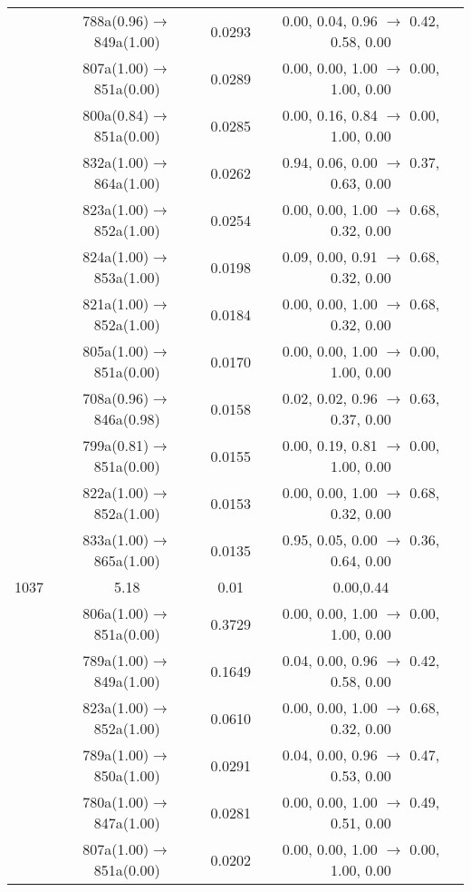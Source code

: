 \documentclass[10pt,a4paper]{article}
\begin{document}
\begin{longtable}{c|c|c|c}
 	& 788a(0.96)$\rightarrow$849a(1.00) &	 0.0293 &	 0.00, 0.04, 0.96 $\rightarrow$ 0.42, 0.58, 0.00 \\ 
 	& 807a(1.00)$\rightarrow$851a(0.00) &	 0.0289 &	 0.00, 0.00, 1.00 $\rightarrow$ 0.00, 1.00, 0.00 \\ 
 	& 800a(0.84)$\rightarrow$851a(0.00) &	 0.0285 &	 0.00, 0.16, 0.84 $\rightarrow$ 0.00, 1.00, 0.00 \\ 
 	& 832a(1.00)$\rightarrow$864a(1.00) &	 0.0262 &	 0.94, 0.06, 0.00 $\rightarrow$ 0.37, 0.63, 0.00 \\ 
 	& 823a(1.00)$\rightarrow$852a(1.00) &	 0.0254 &	 0.00, 0.00, 1.00 $\rightarrow$ 0.68, 0.32, 0.00 \\ 
 	& 824a(1.00)$\rightarrow$853a(1.00) &	 0.0198 &	 0.09, 0.00, 0.91 $\rightarrow$ 0.68, 0.32, 0.00 \\ 
 	& 821a(1.00)$\rightarrow$852a(1.00) &	 0.0184 &	 0.00, 0.00, 1.00 $\rightarrow$ 0.68, 0.32, 0.00 \\ 
 	& 805a(1.00)$\rightarrow$851a(0.00) &	 0.0170 &	 0.00, 0.00, 1.00 $\rightarrow$ 0.00, 1.00, 0.00 \\ 
 	& 708a(0.96)$\rightarrow$846a(0.98) &	 0.0158 &	 0.02, 0.02, 0.96 $\rightarrow$ 0.63, 0.37, 0.00 \\ 
 	& 799a(0.81)$\rightarrow$851a(0.00) &	 0.0155 &	 0.00, 0.19, 0.81 $\rightarrow$ 0.00, 1.00, 0.00 \\ 
 	& 822a(1.00)$\rightarrow$852a(1.00) &	 0.0153 &	 0.00, 0.00, 1.00 $\rightarrow$ 0.68, 0.32, 0.00 \\ 
 	& 833a(1.00)$\rightarrow$865a(1.00) &	 0.0135 &	 0.95, 0.05, 0.00 $\rightarrow$ 0.36, 0.64, 0.00 \\ 
 \hline1037 &	 5.18 &	 0.01 &	 0.00,0.44 \\ 
  	& 806a(1.00)$\rightarrow$851a(0.00) &	 0.3729 &	 0.00, 0.00, 1.00 $\rightarrow$ 0.00, 1.00, 0.00 \\ 
 	& 789a(1.00)$\rightarrow$849a(1.00) &	 0.1649 &	 0.04, 0.00, 0.96 $\rightarrow$ 0.42, 0.58, 0.00 \\ 
 	& 823a(1.00)$\rightarrow$852a(1.00) &	 0.0610 &	 0.00, 0.00, 1.00 $\rightarrow$ 0.68, 0.32, 0.00 \\ 
 	& 789a(1.00)$\rightarrow$850a(1.00) &	 0.0291 &	 0.04, 0.00, 0.96 $\rightarrow$ 0.47, 0.53, 0.00 \\ 
 	& 780a(1.00)$\rightarrow$847a(1.00) &	 0.0281 &	 0.00, 0.00, 1.00 $\rightarrow$ 0.49, 0.51, 0.00 \\ 
 	& 807a(1.00)$\rightarrow$851a(0.00) &	 0.0202 &	 0.00, 0.00, 1.00 $\rightarrow$ 0.00, 1.00, 0.00 \\ 

\end{longtable}
\end{document}
